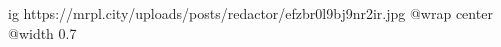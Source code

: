  
 
 
 
 

\ifcmt
  ig https://mrpl.city/uploads/posts/redactor/efzbr0l9bj9nr2ir.jpg
  @wrap center
  @width 0.7
\fi

